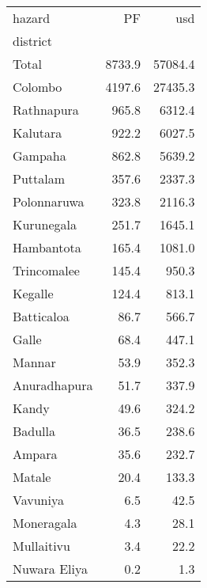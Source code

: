 \begin{tabular}{lrr}
\toprule
hazard &      PF &      usd \\
district     &         &          \\
\midrule
Total        &  8733.9 &  57084.4 \\
Colombo      &  4197.6 &  27435.3 \\
Rathnapura   &   965.8 &   6312.4 \\
Kalutara     &   922.2 &   6027.5 \\
Gampaha      &   862.8 &   5639.2 \\
Puttalam     &   357.6 &   2337.3 \\
Polonnaruwa  &   323.8 &   2116.3 \\
Kurunegala   &   251.7 &   1645.1 \\
Hambantota   &   165.4 &   1081.0 \\
Trincomalee  &   145.4 &    950.3 \\
Kegalle      &   124.4 &    813.1 \\
Batticaloa   &    86.7 &    566.7 \\
Galle        &    68.4 &    447.1 \\
Mannar       &    53.9 &    352.3 \\
Anuradhapura &    51.7 &    337.9 \\
Kandy        &    49.6 &    324.2 \\
Badulla      &    36.5 &    238.6 \\
Ampara       &    35.6 &    232.7 \\
Matale       &    20.4 &    133.3 \\
Vavuniya     &     6.5 &     42.5 \\
Moneragala   &     4.3 &     28.1 \\
Mullaitivu   &     3.4 &     22.2 \\
Nuwara Eliya &     0.2 &      1.3 \\
\bottomrule
\end{tabular}
